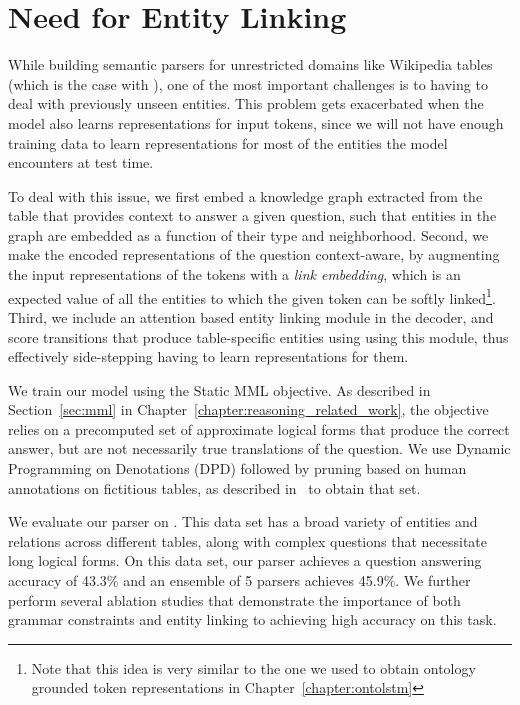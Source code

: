 \section{Need for Entity Linking}
While building semantic parsers for unrestricted domains like Wikipedia tables
(which is the case with \WTQ{}), one of the most important challenges is to
having to deal with previously unseen entities. This problem gets exacerbated when
the model also learns representations for input tokens, since we will not have
enough training data to learn representations for most of the entities the model
encounters at test time.

To deal with this issue, we first embed a knowledge graph extracted from the
table that provides context to answer a given question, such that entities in
the graph are embedded as a function of their type and neighborhood. Second, we
make the encoded representations of the question context-aware, by augmenting
the input representations of the tokens with a \emph{link embedding}, which is
an expected value of all the entities to which the given token can be softly
linked\footnote{Note that this idea is very similar to the one we used to
obtain ontology grounded token representations in Chapter~\ref{chapter:ontolstm}}.
Third, we include an attention based entity linking module in the decoder, and
score transitions that produce table-specific entities using using this module,
thus effectively side-stepping having to learn representations for them.


We train our model using the Static MML objective. As described in Section~\ref{sec:mml} in
Chapter~\ref{chapter:reasoning_related_work}, the objective
relies on a precomputed set of approximate logical forms that produce the
correct answer, but are not necessarily true translations of the question. We
use Dynamic Programming on Denotations (DPD) followed by pruning based on human
annotations on fictitious tables, as described in~\cite{pasupat2016inferring} to
obtain that set.

We evaluate our parser on \WTQ{}.  This data set has
a broad variety of entities and relations across different tables, along with
complex questions that necessitate long logical forms.  On this data set, our
parser achieves a question answering accuracy of 43.3\% and an ensemble of 5
parsers achieves 45.9\%.  We further perform
several ablation studies that demonstrate the importance of both grammar
constraints and entity linking to achieving high accuracy on this task.

